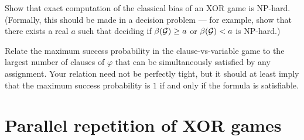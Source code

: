 \begin{exercise}
Show that exact computation of the classical bias of an XOR game is NP-hard. (Formally, this should be made in a decision problem --- for example, show that there exists a real $a$ such that deciding if $\beta(\mathcal{G})\geq a$ or $\beta(\mathcal{G})<a$ is NP-hard.)
\end{exercise}

\begin{exercise}
Relate the maximum success probability in the clause-vs-variable game to the largest number of clauses of $\varphi$ that can be simultaneously satisfied by any assignment. Your relation need not be perfectly tight, but it should at least imply that the maximum success probability is $1$ if and only if the formula is satisfiable. 
\end{exercise}

\section{Parallel repetition of XOR games}

